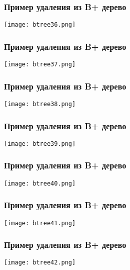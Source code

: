 \begin{frame}
\frametitle{Пример удаления из B+ дерево}
\begin{center}
  \texttt{[image: btree36.png]}
\end{center}
\end{frame}

\begin{frame}
\frametitle{Пример удаления из B+ дерево}
\begin{center}
  \texttt{[image: btree37.png]}
\end{center}
\end{frame}

\begin{frame}
\frametitle{Пример удаления из B+ дерево}
\begin{center}
  \texttt{[image: btree38.png]}
\end{center}
\end{frame}

\begin{frame}
\frametitle{Пример удаления из B+ дерево}
\begin{center}
  \texttt{[image: btree39.png]}
\end{center}
\end{frame}

\begin{frame}
\frametitle{Пример удаления из B+ дерево}
\begin{center}
  \texttt{[image: btree40.png]}
\end{center}
\end{frame}

\begin{frame}
\frametitle{Пример удаления из B+ дерево}
\begin{center}
  \texttt{[image: btree41.png]}
\end{center}
\end{frame}

\begin{frame}
\frametitle{Пример удаления из B+ дерево}
\begin{center}
  \texttt{[image: btree42.png]}
\end{center}
\end{frame}
